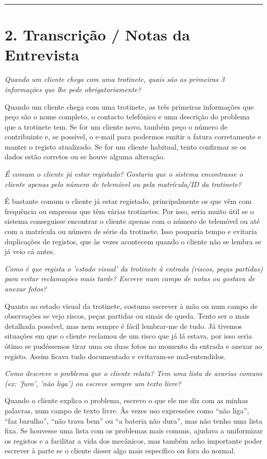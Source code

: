 \documentclass[11pt,a4paper]{article}
\newcommand{\pergunta}[1]{\item[P:] \textit{#1}}
\newcommand{\resposta}[1]{\item[R:] #1}
\begin{document}
	\hrule %
	\vspace{0.5cm}
	
	\section*{2. Transcrição / Notas da Entrevista}
	
	\begin{transcription}
		
		\pergunta{Quando um cliente chega com uma trotinete, quais são as primeiras 3 informações que lhe pede obrigatoriamente?}
		\resposta{Quando um cliente chega com uma trotinete, as três primeiras informações que peço são o nome completo, o contacto telefónico e uma descrição do problema que a trotinete tem. Se for um cliente novo, também peço o número de contribuinte e, se possível, o e-mail para podermos emitir a fatura corretamente e manter o registo atualizado. Se for um cliente habitual, tento confirmar se os dados estão corretos ou se houve alguma alteração.}
		
		\pergunta{É comum o cliente já estar registado? Gostaria que o sistema encontrasse o cliente apenas pelo número de telemóvel ou pela matrícula/ID da trotinete?}
		\resposta{É bastante comum o cliente já estar registado, principalmente os que vêm com frequência ou empresas que têm várias trotinetes. Por isso, seria muito útil se o sistema conseguisse encontrar o cliente apenas com o número de telemóvel ou até com a matrícula ou número de série da trotinete. Isso pouparia tempo e evitaria duplicações de registos, que às vezes acontecem quando o cliente não se lembra se já veio cá antes.}
		
		\pergunta{Como é que regista o 'estado visual' da trotinete à entrada (riscos, peças partidas) para evitar reclamações mais tarde? Escreve num campo de notas ou gostava de anexar fotos?}
		\resposta{Quanto ao estado visual da trotinete, costumo escrever à mão ou num campo de observações se vejo riscos, peças partidas ou sinais de queda. Tento ser o mais detalhada possível, mas nem sempre é fácil lembrar-me de tudo. Já tivemos situações em que o cliente reclamou de um risco que já lá estava, por isso seria ótimo se pudéssemos tirar uma ou duas fotos no momento da entrada e anexar ao registo. Assim ficava tudo documentado e evitavam-se mal-entendidos.}
		
		\pergunta{Como descreve o problema que o cliente relata? Tem uma lista de avarias comuns (ex: 'furo', 'não liga') ou escreve sempre um texto livre?}
		\resposta{Quando o cliente explica o problema, escrevo o que ele me diz com as minhas palavras, num campo de texto livre. Às vezes uso expressões como “não liga”, “faz barulho”, “não trava bem” ou “a bateria não dura”, mas não tenho uma lista fixa. Se houvesse uma lista com os problemas mais comuns, ajudava a uniformizar os registos e a facilitar a vida dos mecânicos, mas também acho importante poder escrever à parte se o cliente disser algo mais específico ou fora do normal.}
		

\end{transcription}
\end{document}
